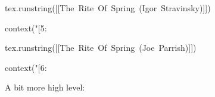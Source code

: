 \typebuffer[run]

\start {} \stop

\stoptitle

\starttitle[title=Via a string]

\startbuffer[run]
\startluacode
tex.runstring([[\hbox{The Rite Of Spring (Igor Stravinsky)}]])

context("[5: %

tex.runstring([[\hbox{The Rite Of Spring (Joe Parrish)}]])

context("[6: %
\stopluacode
\stopbuffer

\typebuffer[run]

\start \getbuffer[run] \stop

\blank[2*big]

A bit more high level:

